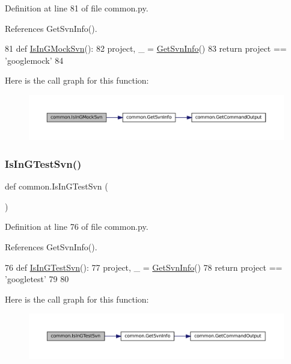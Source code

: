 Definition at line 81 of file common.\+py.



References Get\+Svn\+Info().


\begin{DoxyCode}
81 \textcolor{keyword}{def }\hyperlink{namespacecommon_a8219bb529336fc3f0ef8222a5ed48222}{IsInGMockSvn}():
82   project, \_ = \hyperlink{namespacecommon_a312d07161b76d965fee6a61e464e283f}{GetSvnInfo}()
83   \textcolor{keywordflow}{return} project == \textcolor{stringliteral}{'googlemock'}
84 \end{DoxyCode}
Here is the call graph for this function\+:
\nopagebreak
\begin{figure}[H]
\begin{center}
\leavevmode
\includegraphics[width=350pt]{namespacecommon_a8219bb529336fc3f0ef8222a5ed48222_cgraph}
\end{center}
\end{figure}
\mbox{\label{namespacecommon_af29dcab2d7b4a9dd846446a0987ab387}} 
\subsubsection{\texorpdfstring{Is\+In\+G\+Test\+Svn()}{IsInGTestSvn()}}
{\footnotesize\ttfamily def common.\+Is\+In\+G\+Test\+Svn (\begin{DoxyParamCaption}{ }\end{DoxyParamCaption})}



Definition at line 76 of file common.\+py.



References Get\+Svn\+Info().


\begin{DoxyCode}
76 \textcolor{keyword}{def }\hyperlink{namespacecommon_af29dcab2d7b4a9dd846446a0987ab387}{IsInGTestSvn}():
77   project, \_ = \hyperlink{namespacecommon_a312d07161b76d965fee6a61e464e283f}{GetSvnInfo}()
78   \textcolor{keywordflow}{return} project == \textcolor{stringliteral}{'googletest'}
79 
80 
\end{DoxyCode}
Here is the call graph for this function\+:
\nopagebreak
\begin{figure}[H]
\begin{center}
\leavevmode
\includegraphics[width=350pt]{namespacecommon_af29dcab2d7b4a9dd846446a0987ab387_cgraph}
\end{center}
\end{figure}


